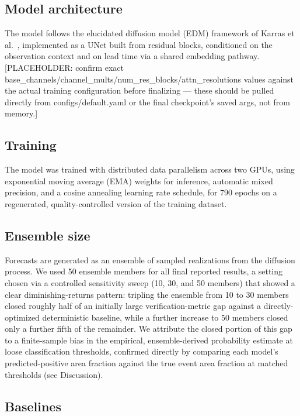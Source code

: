 \documentclass[pdflatex,sn-nature]{sn-jnl}%
\begin{document}
\subsection*{Model architecture}

The model follows the elucidated diffusion model (EDM) framework of
Karras et al.\ \citep{karras2022edm}, implemented as a UNet built from
residual blocks, conditioned on the observation context and on lead
time via a shared embedding pathway. [PLACEHOLDER: confirm exact
base\_channels/channel\_mults/num\_res\_blocks/attn\_resolutions values
against the actual training configuration before finalizing --- these
should be pulled directly from configs/default.yaml or the final
checkpoint's saved args, not from memory.]

\subsection*{Training}

The model was trained with distributed data parallelism across two
GPUs, using exponential moving average (EMA) weights for inference,
automatic mixed precision, and a cosine annealing learning rate
schedule, for 790 epochs on a regenerated, quality-controlled version
of the training dataset.

\subsection*{Ensemble size}

Forecasts are generated as an ensemble of sampled realizations from the
diffusion process. We used 50 ensemble members for all final reported
results, a setting chosen via a controlled sensitivity sweep (10, 30,
and 50 members) that showed a clear diminishing-returns pattern:
tripling the ensemble from 10 to 30 members closed roughly half of an
initially large verification-metric gap against a directly-optimized
deterministic baseline, while a further increase to 50 members closed
only a further fifth of the remainder. We attribute the closed portion
of this gap to a finite-sample bias in the empirical, ensemble-derived
probability estimate at loose classification thresholds, confirmed
directly by comparing each model's predicted-positive area fraction
against the true event area fraction at matched thresholds (see
Discussion).

\subsection*{Baselines}
\end{document}
